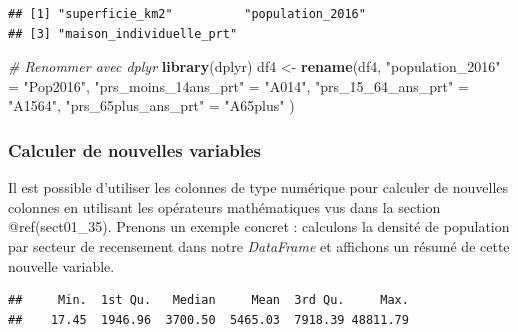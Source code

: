 \documentclass[
  11pt,
  french,
]{book}
\makeatletter
\newenvironment{Shaded}{\begin{snugshade}}{\end{snugshade}}
\newcommand{\CommentTok}[1]{\textcolor[rgb]{0.56,0.35,0.01}{\textit{#1}}}
\newcommand{\DecValTok}[1]{\textcolor[rgb]{0.00,0.00,0.81}{#1}}
\newcommand{\KeywordTok}[1]{\textcolor[rgb]{0.13,0.29,0.53}{\textbf{#1}}}
\newcommand{\NormalTok}[1]{#1}
\newcommand{\OperatorTok}[1]{\textcolor[rgb]{0.81,0.36,0.00}{\textbf{#1}}}
\newcommand{\StringTok}[1]{\textcolor[rgb]{0.31,0.60,0.02}{#1}}
\newenvironment{kframe}{%
\medskip{}
\setlength{\fboxsep}{.8em}
 \def\at@end@of@kframe{}%
 \ifinner\ifhmode%
  \def\at@end@of@kframe{\end{minipage}}%
  \begin{minipage}{\columnwidth}%
 \fi\fi%
 \def\FrameCommand##1{\hskip\@totalleftmargin \hskip-\fboxsep
 \colorbox{shadecolor}{##1}\hskip-\fboxsep
     \hskip-\linewidth \hskip-\@totalleftmargin \hskip\columnwidth}%
 \MakeFramed {\advance\hsize-\width
   \@totalleftmargin\z@ \linewidth\hsize
   \@setminipage}}%
 {\par\unskip\endMakeFramed%
 \at@end@of@kframe}
\renewenvironment{Shaded}{\begin{kframe}}{\end{kframe}}
\makeatother
\begin{document}
\begin{verbatim}
## [1] "superficie_km2"          "population_2016"        
## [3] "maison_individuelle_prt"
\end{verbatim}

\begin{Shaded}
\begin{Highlighting}[]
\CommentTok{# Renommer avec dplyr}
\KeywordTok{library}\NormalTok{(dplyr)}
\NormalTok{df4 <-}\StringTok{ }\KeywordTok{rename}\NormalTok{(df4, }\StringTok{"population_2016"}\NormalTok{ =}\StringTok{ "Pop2016"}\NormalTok{,}
              \StringTok{"prs_moins_14ans_prt"}\NormalTok{ =}\StringTok{ "A014"}\NormalTok{,}
              \StringTok{"prs_15_64_ans_prt"}\NormalTok{ =}\StringTok{ "A1564"}\NormalTok{,}
              \StringTok{"prs_65plus_ans_prt"}\NormalTok{ =}\StringTok{ "A65plus"}
\NormalTok{              )}
\end{Highlighting}
\end{Shaded}

\hypertarget{sect01423}{%
\subsubsection{Calculer de nouvelles variables}\label{sect01423}}

Il est possible d'utiliser les colonnes de type numérique pour calculer de nouvelles colonnes en utilisant les opérateurs mathématiques vus dans la section @ref(sect01\_35). Prenons un exemple concret : calculons la densité de population par secteur de recensement dans notre \emph{DataFrame} et affichons un résumé de cette nouvelle variable.

\begin{Shaded}
\end{Shaded}

\begin{verbatim}
##     Min.  1st Qu.   Median     Mean  3rd Qu.     Max. 
##    17.45  1946.96  3700.50  5465.03  7918.39 48811.79
\end{verbatim}
\end{document}
